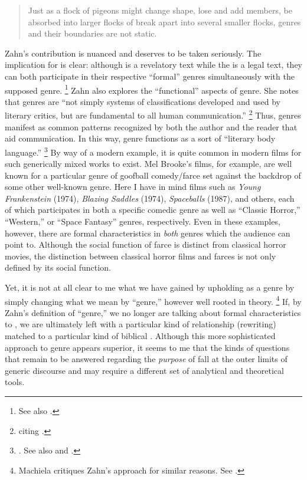 \begin{quote}
    Just as a flock of pigeons might change shape, lose and add members, be absorbed into larger flocks of break apart into several smaller flocks, genres and their boundaries are not static.%
    \autocite[277]{zahn_jbl2012}
\end{quote} 

Zahn's contribution is nuanced and deserves to be taken seriously. The implication for \rwb is clear: although \jub is a revelatory text while the \templescroll is a legal text, they can both participate in their respective ``formal'' genres simultaneously with the supposed \rwb genre.%
    \footnote{%
        See also \cite{fraade_goldstein-etal2017}.}
Zahn also explores the ``functional'' aspects of genre. She notes that genres are ``not simply systems of classifications developed and used by literary critics, but are fundamental to all human communication.''%
    \footnote{%
        \Cite[280]{zahn_jbl2012} citing 
        \cite[37-53]{fowler2002}.}
Thus, genres manifest as common patterns recognized by both the author and the reader that aid communication. In this way, genre functions as a sort of ``literary body language.''%
    \footnote{%
        \Cite[276]{zahn_jbl2012}. See also 
        \cite[199]{newsom_grossman2010} and 
        \cite[37-53]{fowler2002}.}
By way of a modern example, it is quite common in modern films for such generically mixed works to exist. Mel Brooke's films, for example, are well known for a particular genre of goofball comedy/farce set against the backdrop of some other well-known genre. Here I have in mind films such as \emph{Young Frankenstein} (1974), \emph{Blazing Saddles} (1974), \emph{Spaceballs} (1987), and others, each of which participates in both a specific comedic genre as well as ``Classic Horror,'' ``Western,'' or ``Space Fantasy'' genres, respectively. Even in these examples, however, there are formal characteristics in \emph{both} genres which the audience can point to. Although the social function of farce is distinct from classical horror movies, the distinction between classical horror films and farces is not only defined by its social function. 

Yet, it is not at all clear to me what we have gained by upholding \rwb as a genre by simply changing what we mean by ``genre,'' however well rooted in theory.%
    \footnote{%
        Machiela critiques Zahn's approach for similar reasons. See 
        \cite{machiela_jjs2010}.}
If, by Zahn's definition of ``genre,'' we no longer are talking about formal characteristics to \rwb, we are ultimately left with a particular kind of relationship (rewriting) matched to a particular kind of biblical \vorlage. Although this more sophisticated approach to genre appears superior, it seems to me that the kinds of questions that remain to be answered regarding the \emph{purpose} of \rwb fall at the outer limits of generic discourse and may require a different set of analytical and theoretical tools.




